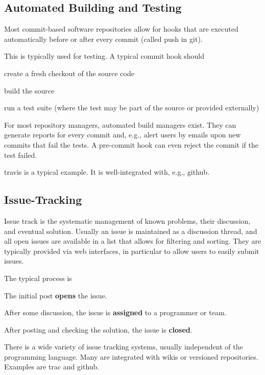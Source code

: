 \subsection{Automated Building and Testing}

Most commit-based software repositories allow for hooks that are executed automatically before or after every commit (called push in git).

This is typically used for testing.
A typical commit hook should
\begin{compactitem}
 \item create a fresh checkout of the source code
 \item build the source
 \item run a test suite (where the test may be part of the source or provided externally)
\end{compactitem}

For most repository managers, automated build managers exist.
They can generate reports for every commit and, e.g., alert users by emails upon new commits that fail the tests.
A pre-commit hook can even reject the commit if the test failed.

travis is a typical example.
It is well-integrated with, e.g., github.

\subsection{Issue-Tracking}

Issue track is the systematic management of known problems, their discussion, and eventual solution.
Usually an issue is maintained as a discussion thread, and all open issues are available in a list that allows for filtering and sorting.
They are typically provided via web interfaces, in particular to allow users to easily submit issues.

The typical process is
\begin{compactenum}
 \item The initial post \textbf{opens} the issue.
 \item After some discussion, the issue is \textbf{assigned} to a programmer or team.
 \item After posting and checking the solution, the issue is \textbf{closed}.
\end{compactenum}

There is a wide variety of issue tracking systems, usually independent of the programming language.
Many are integrated with wikis or versioned repositories.
Examples are trac and github.


